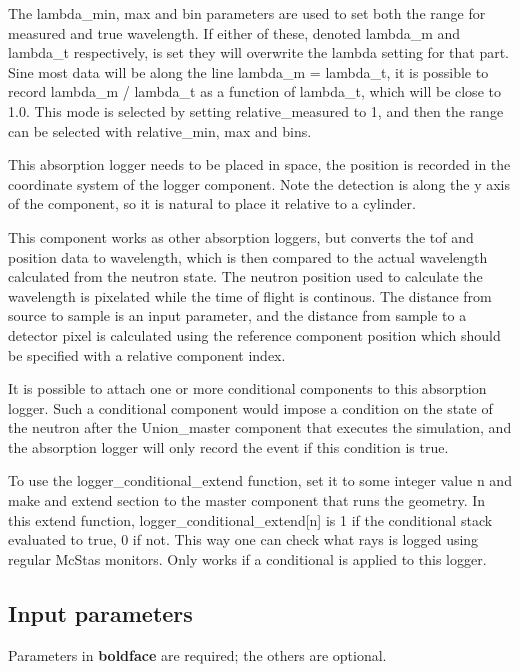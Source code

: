 The lambda\_min, max and bin parameters are used to set both the range for measured and true wavelength. If either of these, denoted lambda\_m and lambda\_t respectively, is set they will overwrite the lambda setting for that part. Sine most data will be along the line lambda\_m = lambda\_t, it is possible to record lambda\_m / lambda\_t as a function of lambda\_t, which will be close to 1.0. This mode is selected by setting relative\_measured to 1, and then the range can be selected with relative\_min, max and bins.

This absorption logger needs to be placed in space, the position is recorded in the coordinate system of the logger component. Note the detection is along the y axis of the component, so it is natural to place it relative to a cylinder.

This component works as other absorption loggers, but converts the tof and position data to wavelength, which is then compared to the actual wavelength calculated from the neutron state. The neutron position used to calculate the wavelength is pixelated while the time of flight is continous. The distance from source to sample is an input parameter, and the distance from sample to a detector pixel is calculated using the reference component position which should be specified with a relative component index.

It is possible to attach one or more conditional components to this absorption logger. Such a conditional component would impose a condition on the state of the neutron after the Union\_master component that executes the simulation, and the absorption logger will only record the event if this condition is true.

To use the logger\_conditional\_extend function, set it to some integer value n and make and extend section to the master component that runs the geometry. In this extend function, logger\_conditional\_extend[n] is 1 if the conditional stack evaluated to true, 0 if not. This way one can check what rays is logged using regular McStas monitors. Only works if a conditional is applied to this logger.

\subsection*{Input parameters}
Parameters in \textbf{boldface} are required; the others are optional.

